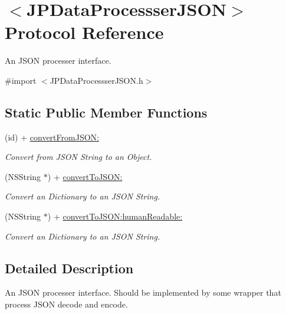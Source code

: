 \hypertarget{a00009}{
\section{$<$JPDataProcessserJSON$>$ Protocol Reference}
\label{a00009}
}


An JSON processer interface.  




{\ttfamily \#import $<$JPDataProcessserJSON.h$>$}

\subsection*{Static Public Member Functions}
\begin{DoxyCompactItemize}
\item 
(id) + \hyperlink{a00009_abbccee0a4144fcd9875e17726c95d7ff}{convertFromJSON:}
\begin{DoxyCompactList}\small\item\em Convert from JSON String to an Object. \item\end{DoxyCompactList}\item 
(NSString $\ast$) + \hyperlink{a00009_af1d4079825237552420d7b3809777ab0}{convertToJSON:}
\begin{DoxyCompactList}\small\item\em Convert an Dictionary to an JSON String. \item\end{DoxyCompactList}\item 
(NSString $\ast$) + \hyperlink{a00009_a12d87c120f62c6f32da80231a1924fa5}{convertToJSON:humanReadable:}
\begin{DoxyCompactList}\small\item\em Convert an Dictionary to an JSON String. \item\end{DoxyCompactList}\end{DoxyCompactItemize}


\subsection{Detailed Description}
An JSON processer interface. Should be implemented by some wrapper that process JSON decode and encode. 

